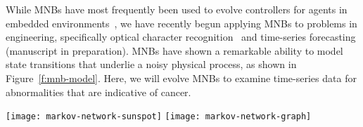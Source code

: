 While MNBs have most frequently been used to evolve controllers for agents in embedded environments~\cite{Edlund:2011kt,Olson:2013kx,Olson:2013ko}, we have recently begun applying MNBs to problems in engineering, specifically optical character recognition~\cite{Chapman:2013kf} and time-series forecasting (manuscript in preparation).  
%
MNBs have shown a remarkable ability to model state transitions that underlie a noisy physical process, as shown in Figure~\ref{f:mnb-model}.  Here, we will evolve MNBs to examine time-series data for abnormalities that are indicative of cancer.

\begin{figure*}
\centering
\texttt{[image: markov-network-sunspot]}
\texttt{[image: markov-network-graph]}
\caption{These figures show preliminary results of using MNBs to forecast space weather, specifically the daily number of sunspots visible from Earth.  This data is highly chaotic, and has a prediction horizon of 8 days.  At top we see a comparison of daily predicted vs.~observed sunspot numbers for the time period 1975 to 1989; at bottom is a depiction of the MNB that evolved to predict this time series.  These results indicate that MNBs are highly effective at time-series analysis.}
\label{f:mnb-model}
\end{figure*}







